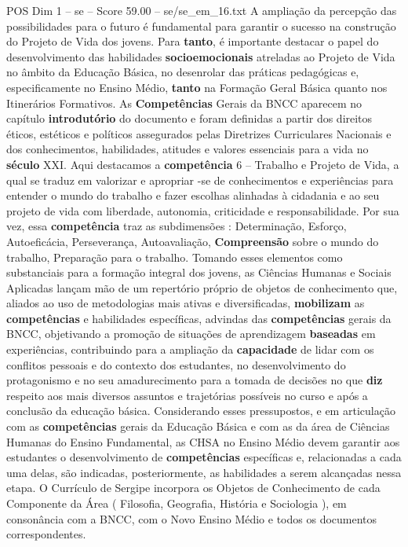 \begin{textsample}{POS Dim 1 – se – Score 59.00 – se/se\_em\_16.txt}
A ampliação da percepção das possibilidades para o futuro é fundamental para garantir o sucesso na construção do Projeto de Vida dos jovens.
Para \textbf{tanto}, é importante destacar o papel do desenvolvimento das habilidades \textbf{socioemocionais} atreladas ao Projeto de Vida no âmbito da Educação Básica, no desenrolar das práticas pedagógicas e, especificamente no Ensino Médio, \textbf{tanto} na Formação Geral Básica quanto nos Itinerários Formativos.
As \textbf{Competências} Gerais da BNCC aparecem no capítulo \textbf{introdutório} do documento e foram definidas a partir dos direitos éticos, estéticos e políticos assegurados pelas Diretrizes Curriculares Nacionais e dos conhecimentos, habilidades, atitudes e valores essenciais para a vida no \textbf{século} XXI.
Aqui destacamos a \textbf{competência} 6 – Trabalho e Projeto de Vida, a qual se traduz em valorizar e apropriar -se de conhecimentos e experiências para entender o mundo do trabalho e fazer escolhas alinhadas à cidadania e ao seu projeto de vida com liberdade, autonomia, criticidade e responsabilidade.
Por sua vez, essa \textbf{competência} traz as subdimensões : Determinação, Esforço, Autoeficácia, Perseverança, Autoavaliação, \textbf{Compreensão} sobre o mundo do trabalho, Preparação para o trabalho.
Tomando esses elementos como substanciais para a formação integral dos jovens, as Ciências Humanas e Sociais Aplicadas lançam mão de um repertório próprio de objetos de conhecimento que, aliados ao uso de metodologias mais ativas e diversificadas, \textbf{mobilizam} as \textbf{competências} e habilidades específicas, advindas das \textbf{competências} gerais da BNCC, objetivando a promoção de situações de aprendizagem \textbf{baseadas} em experiências, contribuindo para a ampliação da \textbf{capacidade} de lidar com os conflitos pessoais e do contexto dos estudantes, no desenvolvimento do protagonismo e no seu amadurecimento para a tomada de decisões no que \textbf{diz} respeito aos mais diversos assuntos e trajetórias possíveis no curso e após a conclusão da educação básica.
Considerando esses pressupostos, e em articulação com as \textbf{competências} gerais da Educação Básica e com as da área de Ciências Humanas do Ensino Fundamental, as CHSA no Ensino Médio devem garantir aos estudantes o desenvolvimento de \textbf{competências} específicas e, relacionadas a cada uma delas, são indicadas, posteriormente, as habilidades a serem alcançadas nessa etapa.
O Currículo de Sergipe incorpora os Objetos de Conhecimento de cada Componente da Área ( Filosofia, Geografia, História e Sociologia ), em consonância com a BNCC, com o Novo Ensino Médio e todos os documentos correspondentes.

\end{textsample}
